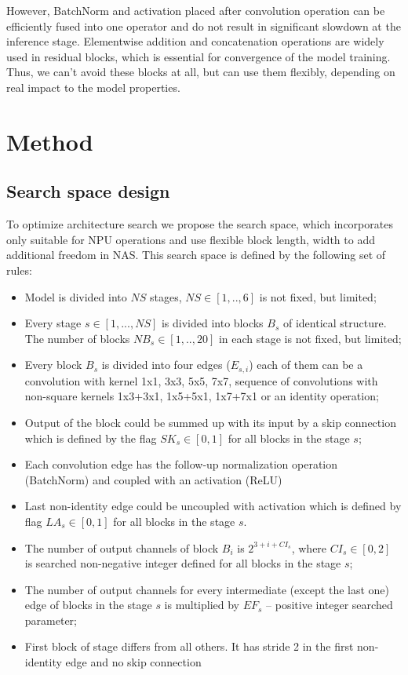 \documentclass[letterpaper]{article}
\begin{document}
However, BatchNorm and activation placed after convolution operation can be efficiently fused into one operator and do not result in significant slowdown at the inference stage.
Elementwise addition and concatenation operations are widely used in residual blocks, which is essential for convergence of the model training.
Thus, we can't avoid these blocks at all, but can use them flexibly, depending on real impact to the model properties.

\section{Method}
\subsection{Search space design}\label{section:search_space}

To optimize architecture search we propose the search space, which incorporates only suitable for NPU operations and use flexible block length, width to add additional freedom in NAS.
This search space is defined by the following set of rules:

\begin{itemize}
\item Model is divided into $NS$ stages, $NS\in[1,..,6]$ is not fixed, but limited;
\item Every stage $s\in[1,...,NS]$ is divided into blocks $B_s$ of identical structure. The number of blocks $NB_s\in[1,..,20]$ in each stage is not fixed, but limited;
\item Every block $B_s$ is divided into four edges ($E_{s,i}$) each of them can be a convolution with kernel 1x1, 3x3, 5x5, 7x7, sequence of convolutions with non-square kernels 1x3+3x1, 1x5+5x1, 1x7+7x1 or an identity operation;
\item Output of the block could be summed up with its input by a skip connection which is defined by the flag $SK_s\in[0,1]$ for all blocks in the stage $s$;
\item Each convolution edge has the follow-up normalization operation (BatchNorm) and coupled with an activation (ReLU)
\item Last non-identity edge could be uncoupled with activation which is defined by flag $LA_s\in[0,1]$ for all blocks in the stage $s$.
\item The number of output channels of block $B_i$ is $2^{3+i+CI_s}$, where $CI_s\in[0,2]$ is searched non-negative integer defined for all blocks in the stage $s$;
\item The number of output channels for every intermediate (except the last one) edge of blocks in the stage $s$ is multiplied by $EF_s$ – positive integer searched parameter;
\item First block of stage differs from all others. It has stride 2 in the first non-identity edge and no skip connection
\end{itemize}
\end{document}
